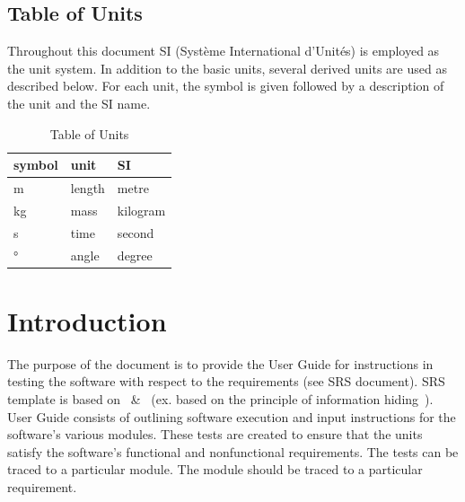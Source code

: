 \documentclass[12pt, titlepage]{article}
\begin{document}
\subsection{Table of Units}

Throughout this document SI (Syst\`{e}me International d'Unit\'{e}s) is
employed as the unit system. In addition to the basic units, several derived
units are
used as described below.  For each unit, the symbol is given followed by a
description of the unit and the SI name.\\

\renewcommand{\arraystretch}{1.2}
\begin{table}[h!]
	\centering
\begin{center}
  \noindent \begin{tabular}{l l l} 
    \toprule		
    \textbf{symbol} & \textbf{unit} & \textbf{SI}\\
    \midrule 
    \si{\metre} & length & metre\\
    \si{\kilogram} & mass & kilogram\\
    \si{\second} & time & second\\
    \si{\degree} & angle & degree\\
    \bottomrule
  \end{tabular}
\end{center}
	\caption{Table of Units}
	\label{Table:R_trace}
\end{table}

\newpage

\tableofcontents

\listoftables %

\listoffigures %

\newpage


\section{Introduction}

The purpose of the document is to provide the User Guide
for instructions in testing the \progname{}software with 
respect to the requirements (see SRS document). SRS template is based 
on~\citep{SmithAndLai2005} \&~\citep{SmithEtAl2007}
(ex. based on the principle of information hiding~\citep{Parnas1972a}).
User Guide consists of outlining software execution and 
input instructions for the software's 
various modules. These tests are created to ensure that the units satisfy 
the software's functional and nonfunctional requirements. The tests can be 
traced to a particular module. The module should be traced to a particular 
requirement. 
\end{document}
